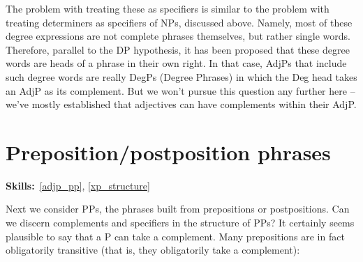 \documentclass{article}
\begin{document}
The problem with treating these as specifiers is similar to the problem with treating determiners as specifiers of NPs, discussed above.
Namely, most of these degree expressions are not complete phrases themselves, but rather single words.
Therefore, parallel to the DP hypothesis, it has been proposed that these degree words are heads of a phrase in their own right.
In that case, AdjPs that include such degree words are really DegPs (Degree Phrases) in which the Deg head takes an AdjP as its complement.
But we won't pursue this question any further here -- we've mostly established that adjectives can have complements within their AdjP. 

\section{Preposition/postposition phrases}
\hfill{}\textbf{Skills:}~\ref{adjp_pp},
\ref{xp_structure}

Next we consider PPs, the phrases built from prepositions or postpositions.
Can we discern complements and specifiers in the structure of PPs?
It certainly seems plausible to say that a P can take a complement.
Many prepositions are in fact obligatorily transitive (that is, they obligatorily take a complement):
\begin{exe}
\end{exe}
\begin{exe}
\end{exe}
\end{document}
